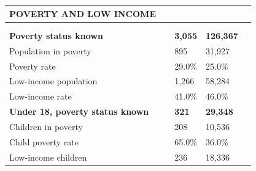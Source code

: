 \documentclass[9pt]{report}
\begin{document}
\vspace{12pt}
\setlength{\tabcolsep}{.01in} %
\begin{tabular}{p{.10in}p{.10in}p{.10in}p{3.7in}>{\hfill}p{.85in}>{\hfill}p{.85in}>{\hfill}p{.85in}>{\hfill}p{.85in}p{0.1in}}
\multicolumn{9}{l}{\parbox{7.1in}{\raggedright{\large{\strut\textbf{POVERTY AND LOW INCOME}\strut}}}} \\ 
\hline
\multicolumn{4}{l}{\parbox{3.5in}{\raggedright{\textbf{}}}} & \multicolumn{1}{r}{\parbox{.85in}{\strut\raggedleft{\textbf{}\strut}}} & \multicolumn{1}{r}{\parbox{.85in}{\strut\raggedleft{\textbf{}\strut}}} & \multicolumn{1}{r}{\parbox{.85in}{\strut{}}} & \multicolumn{1}{r}{\parbox{.85in}{\strut{}}} & \\ 
\multicolumn{9}{l}{} \\ 
\multicolumn{4}{l}{\parbox{3.5in}{\strut\raggedright{\textbf{Poverty status known}\strut}}} & \textbf{} & \textbf{} & \textbf{3,055} & \textbf{126,367} & \textbf{} \\ 
\multicolumn{4}{l}{\parbox{3.6in}{\strut\raggedright{{Population in poverty}}\strut}} &  &  & 895 & 31,927 & \multicolumn{1}{l}{}  \\ 
\multicolumn{4}{l}{\parbox{3.6in}{\strut\raggedright{{Poverty rate}}\strut}} &  &  & 29.0\% & 25.0\% & \multicolumn{1}{l}{}  \\ 
\multicolumn{4}{l}{\parbox{3.6in}{\strut\raggedright{{Low-income population}}\strut}} &  &  & 1,266 & 58,284 & \multicolumn{1}{l}{}  \\ 
\multicolumn{4}{l}{\parbox{3.6in}{\strut\raggedright{{Low-income rate}}\strut}} &  &  & 41.0\% & 46.0\% & \multicolumn{1}{l}{}  \\ 
\multicolumn{4}{l}{\parbox{3.5in}{\strut\raggedright{\textbf{Under 18, poverty status known}\strut}}} & \textbf{} & \textbf{} & \textbf{321} & \textbf{29,348} & \textbf{} \\ 
\multicolumn{4}{l}{\parbox{3.6in}{\strut\raggedright{{Children in poverty}}\strut}} &  &  & 208 & 10,536 & \multicolumn{1}{l}{}  \\ 
\multicolumn{4}{l}{\parbox{3.6in}{\strut\raggedright{{Child poverty rate}}\strut}} &  &  & 65.0\% & 36.0\% & \multicolumn{1}{l}{}  \\ 
\multicolumn{4}{l}{\parbox{3.6in}{\strut\raggedright{{Low-income children}}\strut}} &  &  & 236 & 18,336 & \multicolumn{1}{l}{}  \\ 

\end{tabular}
\end{document}
